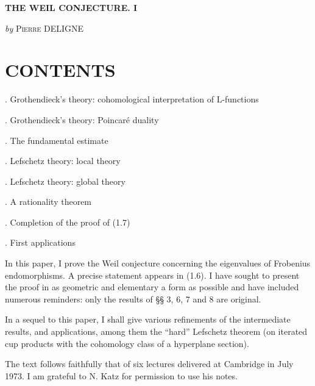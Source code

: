 \documentclass[10pt,leqno]{article}
\begin{document}
\setcounter{page}{273}


\begin{center}{\Large\bfseries THE WEIL CONJECTURE. I}\par\medskip \emph{by} \textsc{Pierre} DELIGNE\end{center}

\label{physical-2}

\section*{CONTENTS}

. Grothendieck’s theory: cohomological interpretation of \(\mathrm{L}\)-functions\par

. Grothendieck’s theory: Poincaré duality\par

. The fundamental estimate\par

. Lefschetz theory: local theory\par

. Lefschetz theory: global theory\par

. A rationality theorem\par

. Completion of the proof of (1.7)\par

. First applications\par

\noindent In this paper, I prove the Weil conjecture concerning the eigenvalues of Frobenius endomorphisms. A precise statement appears in (1.6). I have sought to present the proof in as geometric and elementary a form as possible and have included numerous reminders: only the results of §§ 3, 6, 7 and 8 are original.\par

\noindent In a sequel to this paper, I shall give various refinements of the intermediate results, and applications, among them the “hard” Lefschetz theorem (on iterated cup products with the cohomology class of a hyperplane section).\par

\noindent The text follows faithfully that of six lectures delivered at Cambridge in July 1973. I am grateful to \(\mathrm{N}\). Katz for permission to use his notes.\par
\end{document}
